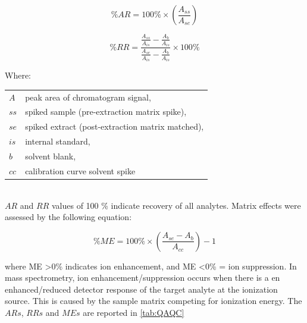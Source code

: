 \begin{equation}
    \label{eq:Recovery}
    \% AR  = 100 \% \times \left ( \frac{A_{ss}}{A_{se}} \right )
\end{equation}

\begin{equation}
    \label{eq:relativeRecovery}
    \% RR = \frac{\frac{A_{ss}}{A_{is}}-\frac{A_{b}}{A_{is}}}{\frac{A_{se}}{A_{is}}-\frac{A_{b}}{A_{is}}}\times 100 \% 
\end{equation}

Where: \newline
\newline
\begin{tabular}{p{1cm}p{20cm}}
    $A$   & peak area of chromatogram signal, \\
    $ss$  & spiked sample (pre-extraction matrix spike), \\
    $se$  & spiked extract (post-extraction matrix matched), \\
    $is$  & internal standard, \\
    $b$   & solvent blank, \\
    $cc$  & calibration curve solvent spike \\
\end{tabular} \\

$AR$ and $RR$ values of 100 \% indicate recovery of all analytes. Matrix effects were assessed by the following equation:

\begin{equation}
    \label{eq:ME}
    \% ME = 100 \% \times \left(\frac{A_{se} - A_b}{A_{cc}}\right )-1 
\end{equation}

where ME \textgreater 0\% indicates ion enhancement, and ME \textless 0\% = ion suppression. In mass spectrometry, ion enhancement/suppression occurs when there is a en enhanced/reduced detector response of the target analyte at the ionization source. This is caused by the sample matrix competing for ionization energy. The $ARs$, $RRs$ and $MEs$ are reported in \cref{tab:QAQC}

